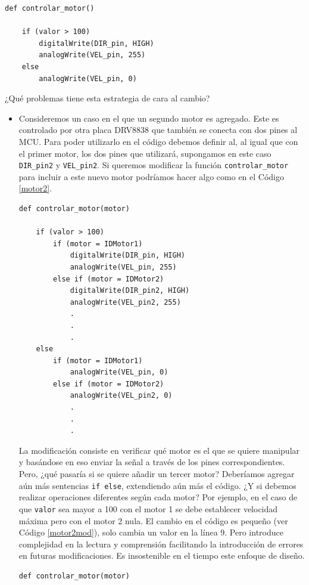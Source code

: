 \begin{lstlisting}[caption=Ejemplo uso del motor DC.,label={listingMotor}]
def controlar_motor()

	if (valor > 100)
    	digitalWrite(DIR_pin, HIGH)
	    analogWrite(VEL_pin, 255)
	else
	    analogWrite(VEL_pin, 0)

\end{lstlisting}

¿Qué problemas tiene esta estrategia de cara al cambio?
\begin{itemize}
	\item Consideremos un caso en el que un segundo motor es agregado. Este es controlado por otra placa \gls{DRV8838} que también se conecta con dos pines al \gls{MCU}. Para poder utilizarlo en el código debemos definir al, al igual que con el primer motor, los dos pines que utilizará, supongamos en este caso \verb|DIR_pin2| y \verb|VEL_pin2|. Si queremos modificar la función \verb|controlar_motor| para incluir a este nuevo motor podríamos hacer algo como en el Código \ref{motor2}.
	
\begin{lstlisting}[caption=Extención de la función controlar\_motor para controlar dos motores.,label={motor2}]
def controlar_motor(motor)

	if (valor > 100)
		if (motor = IDMotor1)
    		digitalWrite(DIR_pin, HIGH)
	    	analogWrite(VEL_pin, 255)
	    else if (motor = IDMotor2)
	    	digitalWrite(DIR_pin2, HIGH)
	    	analogWrite(VEL_pin2, 255)
	    	.
	    	.
	    	.
	else
		if (motor = IDMotor1)
	    	analogWrite(VEL_pin, 0)
	    else if (motor = IDMotor2)
	    	analogWrite(VEL_pin2, 0)
	    	.
	    	.
	    	.

\end{lstlisting}
	
La modificación consiste en verificar qué motor es el que se quiere manipular y basándose en eso enviar la señal a través de los pines correspondientes. Pero, ¿qué pasaría si se quiere añadir un tercer motor? Deberíamos agregar aún más sentencias \verb|if else|, extendiendo aún más el código. ¿Y si debemos realizar operaciones diferentes según cada motor? Por ejemplo, en el caso de que \verb|valor| sea mayor a 100 con el motor 1 se debe establecer velocidad máxima pero con el motor 2 nula. El cambio en el código es pequeño (ver Código \ref{motor2mod}), solo cambia un valor en la línea 9. Pero introduce complejidad en la lectura y comprensión facilitando la introducción de errores en futuras modificaciones. Es insostenible en el tiempo este enfoque de diseño.
\begin{lstlisting}[caption=Modificación de la función controlar\_motor para cambiar comportamiento al utilizar el motor 2.,label={motor2mod}]
def controlar_motor(motor)


\end{lstlisting}
\end{itemize}
